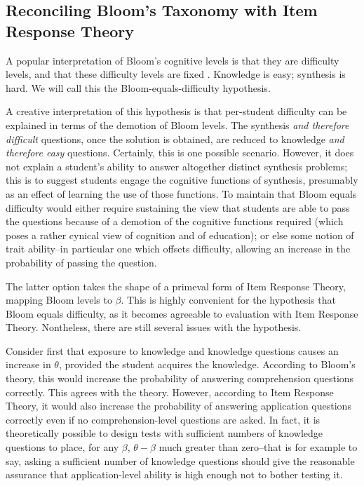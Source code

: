 \subsection{Reconciling Bloom's Taxonomy with Item Response Theory}
\label{sec:reconciling}

A popular interpretation of Bloom's cognitive levels is that they are
difficulty levels, and that these difficulty levels are fixed
\cite{newman1988effect,oliver2004course,lord2007moving,
johnson2006bloom,fuller2007developing}.  Knowledge is easy; synthesis is hard.
We will call this the Bloom-equals-difficulty hypothesis.

A creative interpretation of this hypothesis is that per-student difficulty can
be explained in terms of the demotion of Bloom levels.  The synthesis \emph{and
therefore difficult} questions, once the solution is obtained, are reduced to
knowledge \emph{and therefore easy} questions.  Certainly, this is one possible
scenario.  However, it does not explain a student's ability to answer
altogether distinct synthesis problems; this is to suggest students engage the
cognitive functions of synthesis, presumably as an effect of learning the use
of those functions.  To maintain that Bloom equals difficulty would either
require sustaining the view that students are able to pass the questions
because of a demotion of the cognitive functions required (which poses a rather
cynical view of cognition and of education); or else some notion of trait
ability--in particular one which offsets difficulty, allowing an increase in
the probability of passing the question.

The latter option takes the shape of a primeval form of Item Response Theory,
mapping Bloom levels to $\beta$.  This is highly convenient for the hypothesis
that Bloom equals difficulty, as it becomes agreeable to evaluation with Item
Response Theory.  Nontheless, there are still several issues with the
hypothesis.

Consider first that exposure to knowledge and knowledge questions causes an
increase in $\theta$, provided the student acquires the knowledge.  According
to Bloom's theory, this would increase the probability of answering
comprehension questions correctly.  This agrees with the theory.  However,
according to Item Response Theory, it would also increase the probability of
answering application questions correctly even if no comprehension-level
questions are asked.  In fact, it is theoretically possible to design tests
with sufficient numbers of knowledge questions to place, for any $\beta$,
$\theta-\beta$ much greater than zero--that is for example to say, asking a
sufficient number of knowledge questions should give the reasonable assurance
that application-level ability is high enough not to bother testing it.

